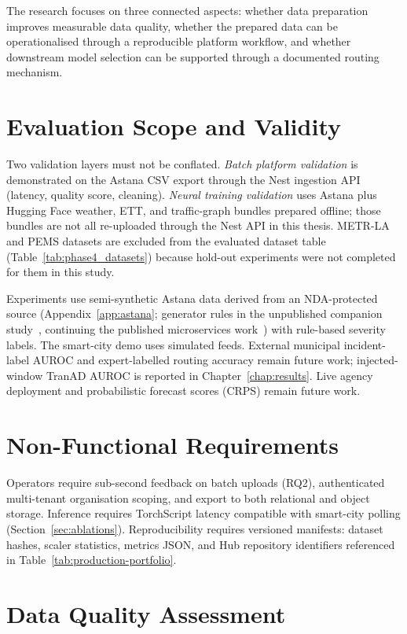 The research focuses on three connected aspects: whether data preparation improves measurable data quality, whether the prepared data can be operationalised through a reproducible platform workflow, and whether downstream model selection can be supported through a documented routing mechanism.

\section{Evaluation Scope and Validity}
\label{sec:evaluation_scope}

Two validation layers must not be conflated. \emph{Batch platform validation} is demonstrated on the Astana CSV export through the Nest ingestion API (latency, quality score, cleaning). \emph{Neural training validation} uses Astana plus Hugging Face weather, ETT, and traffic-graph bundles prepared offline; those bundles are not all re-uploaded through the Nest API in this thesis. METR-LA and PEMS datasets are excluded from the evaluated dataset table (Table~\ref{tab:phase4_datasets}) because hold-out experiments were not completed for them in this study.

Experiments use semi-synthetic Astana data derived from an NDA-protected source (Appendix~\ref{app:astana}; generator rules in the unpublished companion study~\cite{bakytuly2026architectural}, continuing the published microservices work~\cite{bakytuly2026microservices}) with rule-based severity labels. The smart-city demo uses simulated feeds. External municipal incident-label AUROC and expert-labelled routing accuracy remain future work; injected-window TranAD AUROC is reported in Chapter~\ref{chap:results}. Live agency deployment and probabilistic forecast scores (CRPS) remain future work.

\section{Non-Functional Requirements}

Operators require sub-second feedback on batch uploads (RQ2), authenticated multi-tenant organisation scoping, and export to both relational and object storage. Inference requires TorchScript latency compatible with smart-city polling (Section~\ref{sec:ablations}). Reproducibility requires versioned manifests: dataset hashes, scaler statistics, metrics JSON, and Hub repository identifiers referenced in Table~\ref{tab:production-portfolio}.

\section{Data Quality Assessment}

